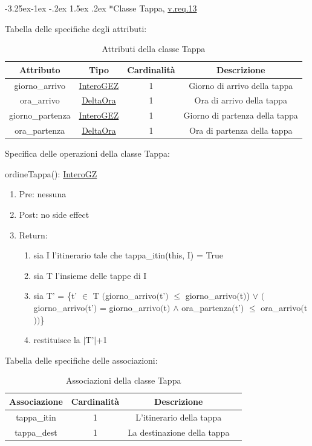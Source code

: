 \documentclass{article}
\makeatletter
\renewcommand\subsection{\@startsection{subsection}{2}{\z@}%
                                     {-3.25ex\@plus -1ex \@minus -.2ex}%
                                     {1.5ex \@plus .2ex}%
                                     {\normalfont\normalsize\bfseries}}
\makeatother
\begin{document}
\newpage
\subsection*{Classe Tappa, \hyperref[sec:RequisitiTappa]{v.req.13}}\label{sec:Tappa}

Tabella delle specifiche degli attributi:
\begin{table}[h!]
    \centering
    \begin{tabular}{|c|c|c|c|}
        \hline
        Attributo & Tipo & Cardinalità & Descrizione \\
        \hline
        giorno\_arrivo & \hyperref[sec:InteroGEZ]{InteroGEZ} & 1 & Giorno di arrivo della tappa \\
        ora\_arrivo & \hyperref[sec:DeltaOra]{DeltaOra} & 1 & Ora di arrivo della tappa \\
        giorno\_partenza & \hyperref[sec:InteroGEZ]{InteroGEZ} & 1 & Giorno di partenza della tappa \\
        ora\_partenza & \hyperref[sec:DeltaOra]{DeltaOra} & 1 & Ora di partenza della tappa \\
        \hline
    \end{tabular}
    \caption{Attributi della classe Tappa}
\end{table}

Specifica delle operazioni della classe Tappa:

ordineTappa(): \hyperref[sec:InteroGZ]{InteroGZ}
\begin{enumerate}
    \item Pre: nessuna
    \item Post: no side effect
    \item Return:
    \begin{enumerate}
        \item sia I l'itinerario tale che tappa\_itin(this, I) = True
        \item sia T l'insieme delle tappe di I
        \item sia T' = \{t' $\in$ T\: $($giorno\_arrivo$($t'$)$ $\leq$ giorno\_arrivo$($t$)$) \newline $\lor$ $($giorno\_arrivo$($t'$)$ = giorno\_arrivo$($t$)$ $\land$ ora\_partenza$($t'$)$ $\leq$ ora\_arrivo$($t$)$$)$\}
        \item restituisce la $|$T'$|$+1
    \end{enumerate}
\end{enumerate}

Tabella delle specifiche delle associazioni:
\begin{table}[h!]
    \centering
    \begin{tabular}{|c|c|c|c|}
        \hline
        Associazione & Cardinalità & Descrizione \\
        \hline
        tappa\_itin & 1 & L'itinerario della tappa \\
        tappa\_dest & 1 & La destinazione della tappa \\
        \hline
    \end{tabular}
    \caption{Associazioni della classe Tappa}
\end{table}
\end{document}
